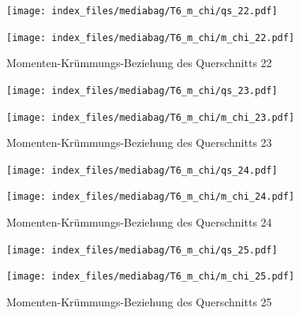 \documentclass[
  11pt,
  letterpaper,
]{scrreprt}
\begin{document}
\begin{figure}[H]

\begin{minipage}{0.50\linewidth}
\texttt{[image: index\_files/mediabag/T6\_m\_chi/qs\_22.pdf]}\end{minipage}%
%
\begin{minipage}{0.50\linewidth}
\texttt{[image: index\_files/mediabag/T6\_m\_chi/m\_chi\_22.pdf]}\end{minipage}%

\caption{\label{fig-mchi_anhang}Momenten-Krümmungs-Beziehung des
Querschnitts 22}

\end{figure}%

\begin{figure}[H]

\begin{minipage}{0.50\linewidth}
\texttt{[image: index\_files/mediabag/T6\_m\_chi/qs\_23.pdf]}\end{minipage}%
%
\begin{minipage}{0.50\linewidth}
\texttt{[image: index\_files/mediabag/T6\_m\_chi/m\_chi\_23.pdf]}\end{minipage}%

\caption{\label{fig-mchi_anhang}Momenten-Krümmungs-Beziehung des
Querschnitts 23}

\end{figure}%

\begin{figure}[H]

\begin{minipage}{0.50\linewidth}
\texttt{[image: index\_files/mediabag/T6\_m\_chi/qs\_24.pdf]}\end{minipage}%
%
\begin{minipage}{0.50\linewidth}
\texttt{[image: index\_files/mediabag/T6\_m\_chi/m\_chi\_24.pdf]}\end{minipage}%

\caption{\label{fig-mchi_anhang}Momenten-Krümmungs-Beziehung des
Querschnitts 24}

\end{figure}%

\begin{figure}[H]

\begin{minipage}{0.50\linewidth}
\texttt{[image: index\_files/mediabag/T6\_m\_chi/qs\_25.pdf]}\end{minipage}%
%
\begin{minipage}{0.50\linewidth}
\texttt{[image: index\_files/mediabag/T6\_m\_chi/m\_chi\_25.pdf]}\end{minipage}%

\caption{\label{fig-mchi_anhang}Momenten-Krümmungs-Beziehung des
Querschnitts 25}

\end{figure}%
\end{document}
